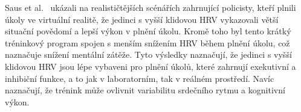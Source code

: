 Saus et al.~\cite{Saus_Johnsen_Eid_Riisem_Andersen_Thayer_2006} ukázali na
realističtějších scénářích zahrnující policisty, kteří plnili úkoly ve virtuální
realitě, že jedinci s vyšší klidovou \gls{HRV} vykazovali větší situační
povědomí a lepší výkon v plnění úkolu. Kromě toho byl tento krátký tréninkový
program spojen s menším snížením \gls{HRV} během plnění úkolu, což naznačuje
snížení mentální zátěže. Tyto výsledky naznačují, že jedinci s vyšší klidovou
\gls{HRV} jsou lépe vybaveni pro plnění úkolů, které zahrnují exekutivní a
inhibiční funkce, a to jak v laboratorním, tak v reálném prostředí. Navíc
naznačují, že trénink může ovlivnit variabilitu srdečního rytmu a kognitivní
výkon.